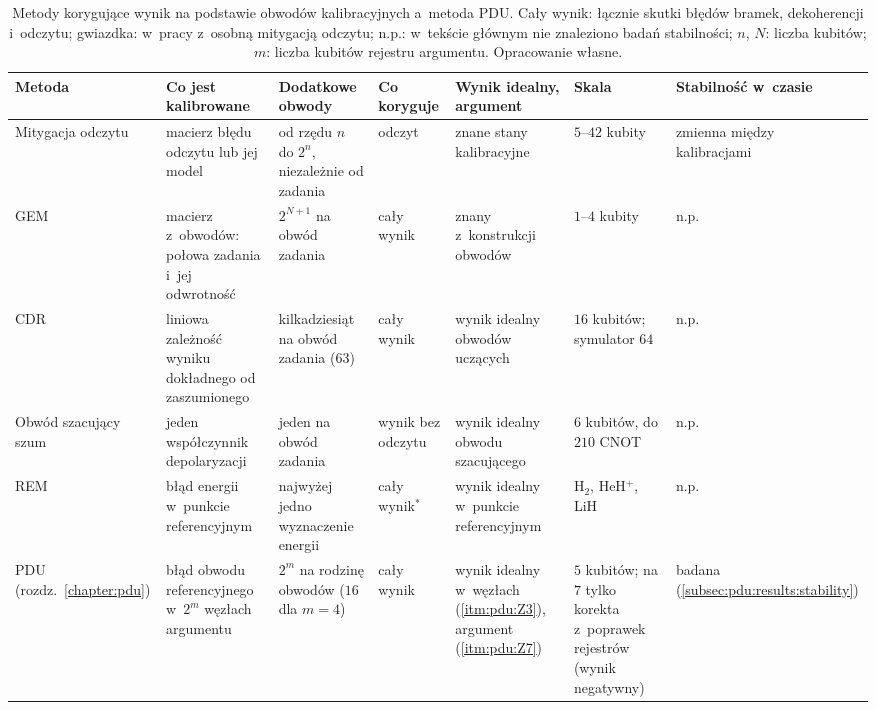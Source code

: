 \begin{table}[tb]
  \centering
  \caption[Metody korygujące wynik na podstawie kalibracji a metoda PDU]{Metody korygujące wynik na podstawie obwodów kalibracyjnych a~metoda PDU. Cały wynik: łącznie skutki błędów bramek, dekoherencji i~odczytu; gwiazdka: w~pracy z~osobną mitygacją odczytu; n.p.: w~tekście głównym nie znaleziono badań stabilności; $n$, $N$: liczba kubitów; $m$: liczba kubitów rejestru argumentu. Opracowanie własne.}
  \label{tab:lr:qem:calibrated}
  \footnotesize
  \setlength{\tabcolsep}{3pt}
  \newcommand{\lrc}[1]{\raggedright\hspace{0pt}#1}
  \begin{tabular}{@{}p{1.75cm}p{2.7cm}p{2.3cm}p{1.2cm}p{2.4cm}p{2.6cm}p{1.7cm}@{}}
    \toprule
    \lrc{\textbf{Metoda}} & \lrc{\textbf{Co jest kalibrowane}} & \lrc{\textbf{Dodatkowe obwody}} & \lrc{\textbf{Co koryguje}} & \lrc{\textbf{Wynik idealny, argument}} & \lrc{\textbf{Skala}} & \lrc{\textbf{Stabilność w~czasie}} \tabularnewline
    \midrule
    \lrc{Mitygacja odczytu \cite{maciejewski_mitigation_2020,bravyi_mitigating_2021,nation_scalable_2021}} & \lrc{macierz błędu odczytu lub jej model} & \lrc{od rzędu $n$ do $2^n$, niezależnie od zadania} & \lrc{odczyt} & \lrc{znane stany kalibracyjne} & \lrc{$5$--$42$ kubity} & \lrc{zmienna między kalibracjami~\cite{maciejewski_mitigation_2020}} \tabularnewline\addlinespace[2pt]
    \lrc{GEM \cite{jattana_general_2020}} & \lrc{macierz z~obwodów: połowa zadania i~jej odwrotność} & \lrc{$2^{N+1}$ na obwód zadania} & \lrc{cały wynik} & \lrc{znany z~konstrukcji obwodów} & \lrc{$1$--$4$ kubity} & \lrc{n.p.} \tabularnewline\addlinespace[2pt]
    \lrc{CDR \cite{czarnik_error_2021}} & \lrc{liniowa zależność wyniku dokładnego od zaszumionego} & \lrc{kilkadziesiąt na obwód zadania ($63$)} & \lrc{cały wynik} & \lrc{wynik idealny obwodów uczących} & \lrc{$16$ kubitów; symulator $64$} & \lrc{n.p.} \tabularnewline\addlinespace[2pt]
    \lrc{Obwód szacujący szum \cite{urbanek_mitigating_2021}} & \lrc{jeden współczynnik depolaryzacji} & \lrc{jeden na obwód zadania} & \lrc{wynik bez odczytu} & \lrc{wynik idealny obwodu szacującego} & \lrc{$6$ kubitów, do $210$ CNOT} & \lrc{n.p.} \tabularnewline\addlinespace[2pt]
    \lrc{REM \cite{lolur_reference-state_2023}} & \lrc{błąd energii w~punkcie referencyjnym} & \lrc{najwyżej jedno wyznaczenie energii} & \lrc{cały wynik$^{\ast}$} & \lrc{wynik idealny w~punkcie referencyjnym} & \lrc{H$_2$, HeH$^+$, LiH} & \lrc{n.p.} \tabularnewline\addlinespace[2pt]
    \lrc{PDU (rozdz.~\ref{chapter:pdu})} & \lrc{błąd obwodu referencyjnego w~$2^m$ węzłach argumentu} & \lrc{$2^m$ na rodzinę obwodów ($16$ dla $m=4$)} & \lrc{cały wynik} & \lrc{wynik idealny w~węzłach (\ref{itm:pdu:Z3}), argument (\ref{itm:pdu:Z7})} & \lrc{$5$ kubitów; na $7$ tylko korekta z~poprawek rejestrów (wynik negatywny)} & \lrc{badana (\ref{subsec:pdu:results:stability})} \tabularnewline
    \bottomrule
  \end{tabular}
\end{table}
